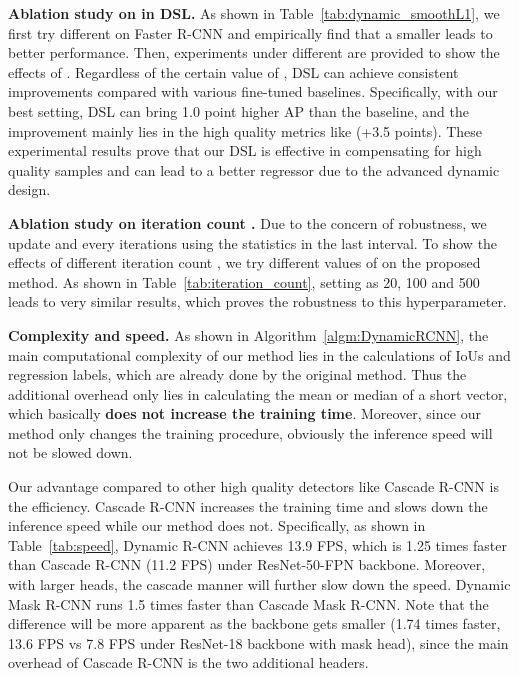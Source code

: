 \documentclass[runningheads]{llncs}
\begin{document}
\noindent
\textbf{Ablation study on  in DSL.}
As shown in Table~\ref{tab:dynamic_smoothL1}, we first try different  on Faster R-CNN and empirically find that a smaller  leads to better performance. Then, experiments under different  are provided to show the effects of . Regardless of the certain value of , DSL can achieve consistent improvements compared with various fine-tuned baselines. Specifically, with our best setting, DSL can bring 1.0 point higher AP than the baseline, and the improvement mainly lies in the high quality metrics like  (+3.5 points). These experimental results prove that our DSL is effective in compensating for high quality samples and can lead to a better regressor due to the advanced dynamic design.

\noindent
\textbf{Ablation study on iteration count .}
Due to the concern of robustness, we update  and  every  iterations using the statistics in the last interval. To show the effects of different iteration count , we try different values of  on the proposed method. As shown in Table~\ref{tab:iteration_count}, setting  as 20, 100 and 500 leads to very similar results, which proves the robustness to this hyperparameter.

\noindent
\textbf{Complexity and speed.}
As shown in Algorithm~\ref{algm:DynamicRCNN}, the main computational complexity of our method lies in the calculations of IoUs and regression labels, which are already done by the original method. Thus the additional overhead only lies in calculating the mean or median of a short vector, which basically \textbf{does not increase the training time}. Moreover, since our method only changes the training procedure, obviously the inference speed will not be slowed down.

Our advantage compared to other high quality detectors like Cascade R-CNN is the efficiency. Cascade R-CNN increases the training time and slows down the inference speed while our method does not. Specifically, as shown in Table~\ref{tab:speed}, Dynamic R-CNN achieves 13.9 FPS, which is 1.25 times faster than Cascade R-CNN (11.2 FPS) under ResNet-50-FPN backbone. Moreover, with larger heads, the cascade manner will further slow down the speed. Dynamic Mask R-CNN runs 1.5 times faster than Cascade Mask R-CNN. Note that the difference will be more apparent as the backbone gets smaller (1.74 times faster, 13.6 FPS vs 7.8 FPS under ResNet-18 backbone with mask head), since the main overhead of Cascade R-CNN is the two additional headers.
\end{document}
